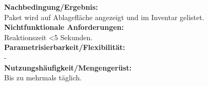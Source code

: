\textbf{Nachbedingung/Ergebnis:}\\
Paket wird auf Ablagefläche angezeigt und im Inventar gelistet.\\
\textbf{Nichtfunktionale Anforderungen:}\\
Reaktionszeit \textless 5 Sekunden.\\
\textbf{Parametrisierbarkeit/Flexibilität:}\\
-\\
\textbf{Nutzungshäufigkeit/Mengengerüst:}\\
Bis zu mehrmals täglich.